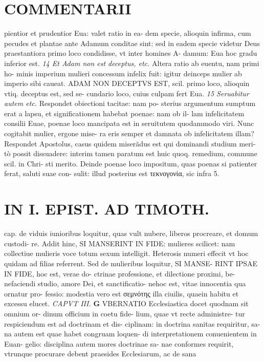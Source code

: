 \documentclass{article}
\begin{document}
\begin{pages}
\section*{COMMENTARII }\pstart pientior et prudentior Eua: valet ratio in ea- dem specie, alioquin infirma, cum pecudes et plantae ante Adamum conditae sint: sed in eadem specie videtur Deus praestantiora primo loco condidisse, vt inter homines A- damum: Eua hoc gradu inferior est.  \pend
\textit{14 Et Adam non est deceptus, etc. }\pstart Altera ratio ab euentu, nam primi ho- minis imperium mulieri concessum infelix fuit: igitur deinceps mulier ab imperio sibi caueat. ADAM NON DECEPTVS EST, scil. primo loco, alioquin vtiq. deceptus est, sed se- cundario loco, cuius culpam fert Eua.  \pend
\textit{15 Seruabitur autem etc. }\pstart Respondet obiectioni tacitae: nam po- sterius argumentum sumptum erat a lapsu, et significationem habebat poenae: nam ob il- lam infelicitatem consilii Euae, poenae loco mancipata est in seruitutem quodammodo viri. Nunc cogitabit mulier, ergone mise- ra eris semper et damnata ob infelicitatem illam? Respondet Apostolus, casus quidem miserãdus est qui dominandi studium meri- tò possit dissuadere: interim tamen paratum est huic quoq. remedium, commune scil. in Chri- sti merito. Deinde poenae loco impositum, quas poenas si patienter ferat, saluti suae con- sulit: illud posterius est τεκνογονία, sic infra 5.  \pend
\section*{IN I. EPIST. AD TIMOTH. }
\marginpar{[ p.59 ]}\pstart cap. de viduis iunioribus loquitur, quas vult nubere, liberos procreare, et domum custodi- re. Addit hinc, SI MANSERINT IN FIDE: mulieres scilicet: nam collectiue mulieris voce totum sexum intelligit. Heterosis numeri effecit vt hoc quidam ad filias referrent. Sed de mulieribus loquitur, SI MANSE- RINT IPSAE IN FIDE, hoc est, verae do- ctrinae professione, et dilectione proximi, be- nefaciendi studio, amore Dei, et sanctificatio- nehoc est, vitae innocentia qua ornatur pro- fessio: modestia vero est σεμνότης illa ciuilis, quaein habitu et excessu elucet.  \pend
\textit{CAPVT III. }
\textbf{G }\pstart VBERNATIO Ecclesiastica docet quodnam sit omnium or- dinum officium in coetu fide- lium, quae vt recte administre- tur respiciendum est ad doctrinam et dis- ciplinam: in doctrina sanitas requiritur, sa- na autem est quae habet congruam loquen- di interpretationem conuenientem in Euan- gelio: disciplina autem mores doctrinae sa- nae conformes requirit, vtrunque procurare debent praesides Ecclesiarum, ac de sana  \pend
\marginpar{[ p.60 ]}

\end{pages}
\end{document}
